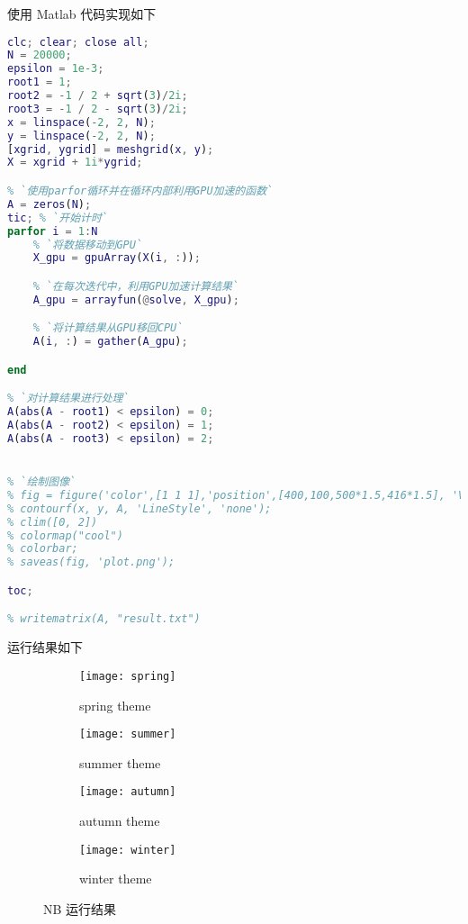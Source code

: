 \documentclass[UTF8]{ctexart}
\begin{document}
    使用 Matlab 代码实现如下
    \begin{lstlisting}[language=Matlab, breaklines = true,label={lst:lstlisting1}]
clc; clear; close all;
N = 20000;
epsilon = 1e-3;
root1 = 1;
root2 = -1 / 2 + sqrt(3)/2i;
root3 = -1 / 2 - sqrt(3)/2i;
x = linspace(-2, 2, N);
y = linspace(-2, 2, N);
[xgrid, ygrid] = meshgrid(x, y);
X = xgrid + 1i*ygrid;

% `使用parfor循环并在循环内部利用GPU加速的函数`
A = zeros(N);
tic; % `开始计时`
parfor i = 1:N
    % `将数据移动到GPU`
    X_gpu = gpuArray(X(i, :));

    % `在每次迭代中，利用GPU加速计算结果`
    A_gpu = arrayfun(@solve, X_gpu);

    % `将计算结果从GPU移回CPU`
    A(i, :) = gather(A_gpu);

end

% `对计算结果进行处理`
A(abs(A - root1) < epsilon) = 0;
A(abs(A - root2) < epsilon) = 1;
A(abs(A - root3) < epsilon) = 2;


% `绘制图像`
% fig = figure('color',[1 1 1],'position',[400,100,500*1.5,416*1.5], 'Visible','off');
% contourf(x, y, A, 'LineStyle', 'none');
% clim([0, 2])
% colormap("cool")
% colorbar;
% saveas(fig, 'plot.png');

toc;

% writematrix(A, "result.txt")
    \end{lstlisting}
    运行结果如下
    \begin{figure}[htbp]
        \centering
        \begin{subfigure}[b]{0.42\textwidth}
            \texttt{[image: spring]}
            \caption{spring theme}\label{fig:figure1.1}
        \end{subfigure}
        \hfill
        \begin{subfigure}[b]{0.42\textwidth}
            \texttt{[image: summer]}
            \caption{summer theme}\label{fig:figure1.2}
        \end{subfigure}
        \hfill
        \begin{subfigure}[b]{0.42\textwidth}
            \texttt{[image: autumn]}
            \caption{autumn theme}\label{fig:figure1.3}
        \end{subfigure}
        \hfill
        \begin{subfigure}[b]{0.42\textwidth}
            \texttt{[image: winter]}
            \caption{winter theme}\label{fig:figure1.4}
        \end{subfigure}
        \caption{NB 运行结果}\label{fig:figure1}
    \end{figure}
\end{document}
